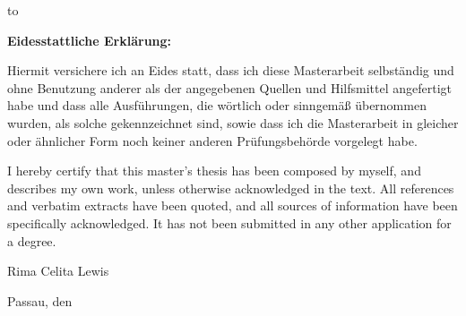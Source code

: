 \thispagestyle{empty}
\vspace*{25\baselineskip}
\hbox to \textwidth{\hrulefill}
\par
\textbf{Eidesstattliche Erklärung:}

Hiermit versichere ich an Eides statt, dass ich diese Masterarbeit selbständig und
ohne Benutzung anderer als der angegebenen Quellen und Hilfsmittel angefertigt
habe und dass alle Ausführung\-en, die wörtlich oder sinngemäß übernommen wurden,
als solche gekenn\-zeichnet sind, sowie dass ich die Masterarbeit in gleicher oder
ähnlicher Form noch keiner anderen Prüfungsbehörde vorgelegt habe.

I hereby certify that this master’s thesis has been composed by myself, and describes my own work, unless otherwise acknowledged in the text. All references and verbatim extracts have been quoted, and all sources of information have been specifically acknowledged. It has not been submitted in any other application for a
degree.

\vspace*{20pt}

Rima Celita Lewis

Passau, den \thefullgermandate
%
%

\clearpage
